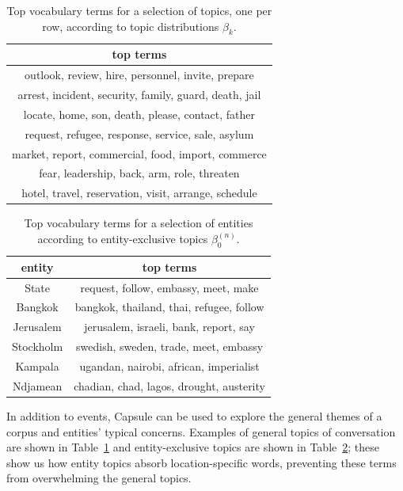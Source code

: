 \begin{table}
\centering
\small
\begin{tabular}{c}
\toprule
top terms \\
\midrule
outlook, review, hire, personnel, invite, prepare \\
arrest, incident, security, family, guard, death, jail \\
locate, home, son, death, please, contact, father \\
request, refugee, response, service, sale, asylum \\
market, report, commercial, food, import, commerce \\
fear, leadership, back, arm, role, threaten \\
hotel, travel, reservation, visit, arrange, schedule \\
\bottomrule
\end{tabular}
\label{tab:topics}
\caption{Top vocabulary terms for a selection of topics, one per row, according to topic distributions $\beta_k$.}
\end{table}

\begin{table}
\centering
\small
\begin{tabular}{cc}
\toprule
entity & top terms \\
\midrule
State & request, follow, embassy, meet, make \\
Bangkok & bangkok, thailand, thai, refugee, follow \\
Jerusalem & jerusalem, israeli, bank, report, say \\
Stockholm & swedish, sweden, trade, meet, embassy \\
Kampala & ugandan, nairobi, african, imperialist \\
Ndjamean & chadian, chad, lagos, drought, austerity \\
\bottomrule
\end{tabular}
\label{tab:entities}
\caption{Top vocabulary terms for a selection of entities according to entity-exclusive topics $\beta^{(n)}_0$.}
\end{table}

In addition to events, Capsule can be used to explore the general themes of a corpus and entities' typical concerns.  Examples of general topics of conversation are shown in Table~\ref{tab:topics} and entity-exclusive topics are shown in Table~\ref{tab:entities}; these show us how entity topics absorb location-specific words, preventing these terms from overwhelming the general topics.

